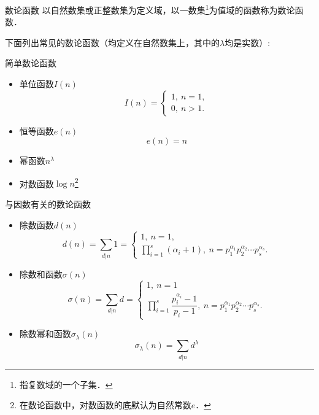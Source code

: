 

\begin{issues}
\issueDraft
\issueMissDepend
\end{issues}

\begin{definition}{数论函数}
以自然数集或正整数集为定义域，以一数集\footnote{指复数域的一个子集．}为值域的函数称为数论函数．
\end{definition}

下面列出常见的数论函数（均定义在自然数集上，其中的$\lambda$均是实数）:
\begin{example}{简单数论函数}
\begin{itemize}
\item 单位函数$I(n)$
\begin{equation}
I(n) =
\begin{cases}
1,\ n = 1,\\
0,\ n > 1.
\end{cases}
\end{equation}
\item 恒等函数$e(n)$
\begin{equation}
e(n)=n
\end{equation}
\item 幂函数$n^\lambda$
\item 对数函数$\log n$\footnote{在数论函数中，对数函数的底默认为自然常数$e$．}
\end{itemize}
\end{example}
\begin{example}{与因数有关的数论函数}
\begin{itemize}
\item 除数函数$d(n)$
\begin{equation}
d(n)=\sum_{d|n} 1=
\begin{cases}
1,\ n=1,\\
\prod\limits_{i=1}^{s}(\alpha_i+1),\ n=p_1^{\alpha_1}p_2^{\alpha_2}\cdots p_s^{\alpha_s}.
\end{cases}
\end{equation}
\item 除数和函数$\sigma(n)$
\begin{equation}
\sigma(n)=\sum_{d|n}d=
\begin{cases}
1,\ n=1\\
\prod\limits_{i=1}^{s}\dfrac{p_i^{\alpha_i}-1}{p_i-1},\ n=p_1^{\alpha_1}p_2^{\alpha_2}\cdots p_s^{\alpha_s}.
\end{cases}
\end{equation}
\item 除数幂和函数$\sigma_\lambda(n)$
\begin{equation}
\sigma_\lambda(n)=\sum_{d|n}d^\lambda
\end{equation}
\end{itemize}
\end{example}
